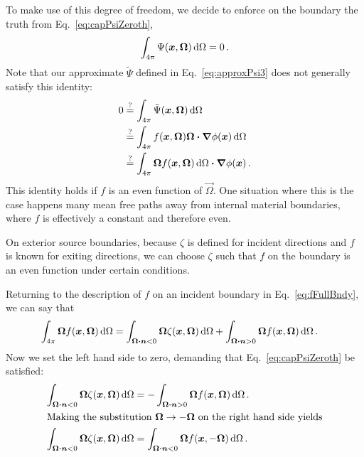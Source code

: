 To make use of this degree of freedom, we decide to enforce on the boundary the
truth from Eq.~\eqref{eq:capPsiZeroth},
\begin{equation*}
  \int_{4\pi} \Psi(\bm{x}, \bm{\Omega}) \mathop{}\!\mathrm{d}\Omega
  = 0 \,.
\end{equation*}
Note that our approximate $\tilde\Psi$ defined in Eq.~\eqref{eq:approxPsi3}
does not generally satisfy this identity:
\begin{align*}
  0
&\stackrel{\mathrm{?}}{=} \int_{4\pi} \tilde\Psi(\bm{x}, \bm{\Omega}) \mathop{}\!\mathrm{d}\Omega
\\
&\stackrel{\mathrm{?}}{=} \int_{4\pi} f(\bm{x}, \bm{\Omega}) \bm{\Omega}
\bm{\cdot} \bm{\nabla} \phi(\bm{x})
\mathop{}\!\mathrm{d}\Omega
\\
&\stackrel{\mathrm{?}}{=} \int_{4\pi} \bm{\Omega} f(\bm{x}, \bm{\Omega})\mathop{}\!\mathrm{d}\Omega
\bm{\cdot} \bm{\nabla} \phi(\bm{x}) \,.
\end{align*}
This identity holds if $f$ is an even function of $\vec{\Omega}$.
One situation where this is the case happens many mean free paths away from
internal material boundaries, where $f$ is effectively a constant and therefore
even.

On exterior source boundaries, because $\zeta$ is defined for incident
directions and $f$ is known for exiting directions, we can choose $\zeta$ such
that $f$ on the boundary is an even function under certain conditions.

Returning to the description of $f$ on an incident boundary in
Eq.~\eqref{eq:fFullBndy}, we can say that
\begin{align*}
  \int_{4\pi} \bm{\Omega} f(\bm{x}, \bm{\Omega})\mathop{}\!\mathrm{d}\Omega
  &= \int_{\bm{\Omega} \bm{\cdot} \bm{n} < 0}
  \bm{\Omega} \zeta(\bm{x}, \bm{\Omega})\mathop{}\!\mathrm{d}\Omega
  + \int_{\bm{\Omega} \bm{\cdot} \bm{n} > 0}
  \bm{\Omega} f(\bm{x}, \bm{\Omega})\mathop{}\!\mathrm{d}\Omega\,.
\end{align*}
Now we set the left hand side to zero, demanding that
Eq.~\eqref{eq:capPsiZeroth} be satisfied:
\begin{align} \nonumber
  \int_{\bm{\Omega} \bm{\cdot} \bm{n} < 0}
  \bm{\Omega} \zeta(\bm{x}, \bm{\Omega})\mathop{}\!\mathrm{d}\Omega
  &= -\int_{\bm{\Omega} \bm{\cdot} \bm{n} > 0}
  \bm{\Omega} f(\bm{x}, \bm{\Omega})\mathop{}\!\mathrm{d}\Omega \,.
  \\ 
  \intertext{Making the substitution $\bm{\Omega}\to -\bm{\Omega}$ on the
  right hand side yields}
  \label{eq:zetaCondition}
  \int_{\bm{\Omega} \bm{\cdot} \bm{n} < 0}
  \bm{\Omega} \zeta(\bm{x}, \bm{\Omega})\mathop{}\!\mathrm{d}\Omega
  &= \int_{\bm{\Omega} \bm{\cdot} \bm{n} < 0}
  \bm{\Omega} f(\bm{x}, -\bm{\Omega})\mathop{}\!\mathrm{d}\Omega \,.
\end{align}

